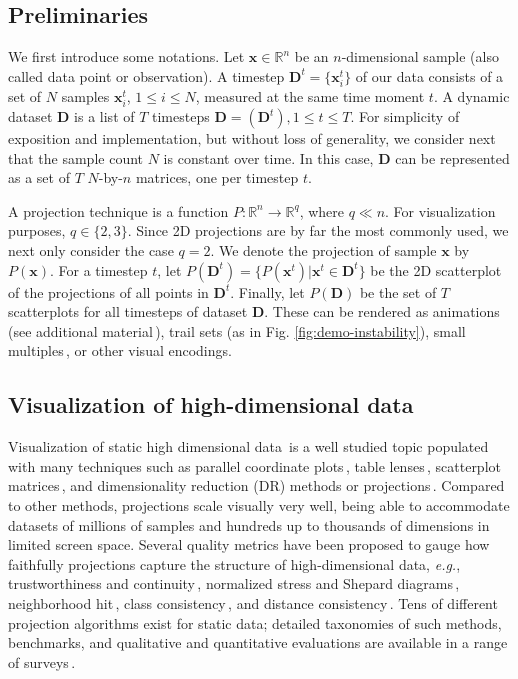 \subsection{Preliminaries}
%
We first introduce some notations. Let
$\mathbf{x} \in \mathbb{R}^n$
be an $n$-dimensional sample (also called data point or observation). A timestep $\mathbf{D}^t = \{\mathbf{x}_i^t\}$ of our data consists of a set of $N$ samples $\mathbf{x}_i^t$, $1 \leq i \leq N$, 
measured at the same time moment $t$. A dynamic dataset $\mathbf{D}$ is a list of $T$ timesteps $\mathbf{D}= ( \mathbf{D}^{t} ), 1 \leq t \leq T$. For simplicity of exposition and implementation, but without loss of generality, we consider next that the sample count $N$ is constant over time. In this case, $\mathbf{D}$ can be represented as a set of $T$ $N$-by-$n$ matrices, one per timestep $t$.

A projection technique is a function $P: \mathbb{R}^{n} \rightarrow \mathbb{R}^{q}$, where $q \ll n$. For visualization purposes, $q \in \{2,3\}$. Since 2D projections are by far the most commonly used, we next only consider the case $q=2$. We denote the projection of sample $\mathbf{x}$ by $P(\mathbf{x})$. For a timestep $t$, let $P(\mathbf{D}^{t}) = \{ P(\mathbf{x}^t) | \mathbf{x}^t \in \mathbf{D}^{t} \}$ be the 2D scatterplot of the projections of all points in
$\mathbf{D}^{t}$. Finally, let $P(\mathbf{D})$ be the set of $T$ scatterplots for all timesteps of dataset $\mathbf{D}$. These can be rendered as animations (see additional material\,\cite{repo-guided}), trail sets (as in Fig. \ref{fig:demo-instability}), small multiples\,\cite{Rauber2016}, or other visual encodings. 


\subsection{Visualization of high-dimensional data}
\label{sec:rw_vis_dynamic}
%

Visualization of static high dimensional data\,\cite{Liu2017} is a well studied topic populated with many techniques such as parallel coordinate plots\,\cite{Inselberg1990}, table lenses\,\cite{Rao2003}, scatterplot matrices\,\cite{Becker1996}, and dimensionality reduction (DR) methods or projections\,\cite{vanderMaaten2009}. Compared to other methods, projections scale visually very well, being able to accommodate datasets of millions of samples and hundreds up to thousands of dimensions in limited screen space. Several quality metrics have been proposed to gauge how faithfully projections capture the structure of high-dimensional data, \emph{e.g.}, trustworthiness and continuity\,\cite{venna06}, normalized stress and Shepard diagrams\,\cite{Joia2011}, neighborhood hit\,\cite{Paulovich2008}, class consistency\,\cite{tatu10}, and distance consistency\,\cite{sips09}. Tens of different projection algorithms exist for static data; detailed taxonomies of such methods, benchmarks, and qualitative and quantitative evaluations are available in a range of surveys\,\cite{Nonato2019,Espadoto2019,fodor02_survey,cunningham15_survey,sorzano14_survey,vanderMaaten2009}.


